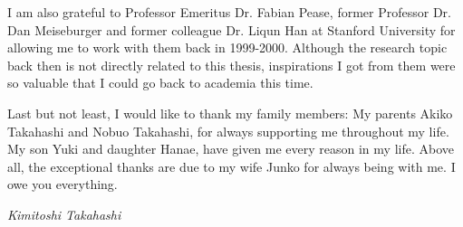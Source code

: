I am also grateful to Professor Emeritus Dr. Fabian Pease, former Professor Dr. Dan Meiseburger and former colleague Dr. Liqun Han at Stanford University for allowing me to work with them back in 1999-2000.
Although the research topic back then is not directly related to this thesis, inspirations I got from them were so valuable that I could go back to academia this time.



Last but not least, I would like to thank my family members: My parents Akiko Takahashi and Nobuo Takahashi, for always supporting me throughout my life.
My son Yuki and daughter Hanae, have given me every reason in my life.
Above all, the exceptional thanks are due to my wife Junko for always being with me. I owe you everything.


\begin{flushright}
{\em\Large Kimitoshi Takahashi} \par{}
\end{flushright}





